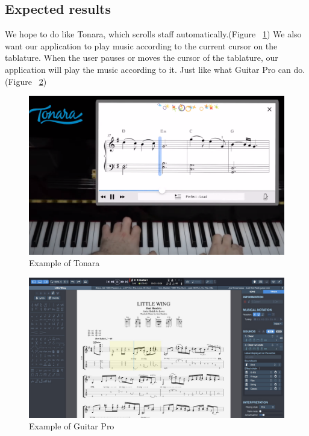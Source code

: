 \documentclass[10pt,twocolumn,letterpaper]{article}
\begin{document}
\begin{CJK}{UTF8}{bsmi}
\section{Expected results}

We hope to do like Tonara\cite{Tonara}, which scrolls staff automatically.(Figure ~\ref{fig:tonara}) We also want our application to play music according to the current cursor on the tablature. When the user pauses or moves the cursor of the tablature, our application will play the music according to it. Just like what Guitar Pro\cite{GuitarPro} can do.(Figure ~\ref{fig:gp75})

\begin{figure}[t]
\begin{center}
   \includegraphics[width=0.8\linewidth]{tonara.png}
\end{center}
   \caption{Example of Tonara\cite{Tonara2}}
\label{fig:long}
\label{fig:tonara}
\end{figure}

\begin{figure}[t]
\begin{center}
   \includegraphics[width=0.8\linewidth]{gp75.jpg}
\end{center}
   \caption{Example of Guitar Pro\cite{GuitarPro}}
\label{fig:long}
\label{fig:gp75}
\end{figure}


{\small


}

\end{CJK}
\end{document}
